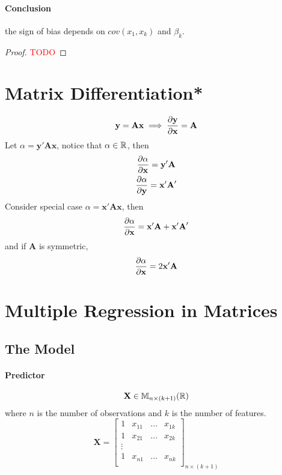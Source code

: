 \documentclass[]{article}
\begin{document}
    \paragraph{Conclusion} the sign of bias depends on $cov(x_1, x_k)$ and $\beta_k$.
    
    \begin{proof}
    	\textcolor{red}{TODO}
    \end{proof}
    
    \section{Matrix Differentiation*}
    	\begin{equation}
    		\textbf{y} = \textbf{A} \textbf{x} \implies \frac{\partial{\textbf{y}}}{\partial{\textbf{x}}} = \textbf{A}
    	\end{equation}
    	Let $\alpha = \textbf{y}' \textbf{A} \textbf{x}$, notice that $\alpha \in \mathbb{R}$, then 
    	\begin{gather}
    		\frac{\partial{\alpha}}{\partial{\textbf{x}}} = \textbf{y}' \textbf{A} \\
    		\frac{\partial{	\alpha}}{\partial{\textbf{y}}} = \textbf{x}' \textbf{A}'
    	\end{gather}
    	Consider special case $\alpha = \textbf{x}' \textbf{A} \textbf{x}$, then 
    	\begin{equation}
    		\frac{\partial{\alpha}}{\partial{\textbf{x}}} = \textbf{x}' \textbf{A} + \textbf{x}' \textbf{A}'
    	\end{equation}
    	and if $\textbf{A}$ is symmetric, 
    	\begin{equation}
    		\frac{\partial{\alpha}}{\partial{\textbf{x}}} = 2 \textbf{x}' \textbf{A}
    	\end{equation}
    
    \section{Multiple Regression in Matrices}
    	\subsection{The Model}
    		\paragraph{Predictor}
    			\[
    				\textbf{X} \in \mathbb{M}_{n \times (k+1)}(\mathbb{R})
    			\]
    			where $n$ is the number of observations and $k$ is the number of features.
    			\[
    				\textbf{X} = \begin{bmatrix}
    					1 & x_{11} & \dots & x_{1k} \\
    					1 & x_{21} & \dots & x_{2k} \\
    					\vdots \\
    					1 & x_{n1} & \dots & x_{nk} \\
    				\end{bmatrix}_{n \times (k+1)}
    			\]
\end{document}
